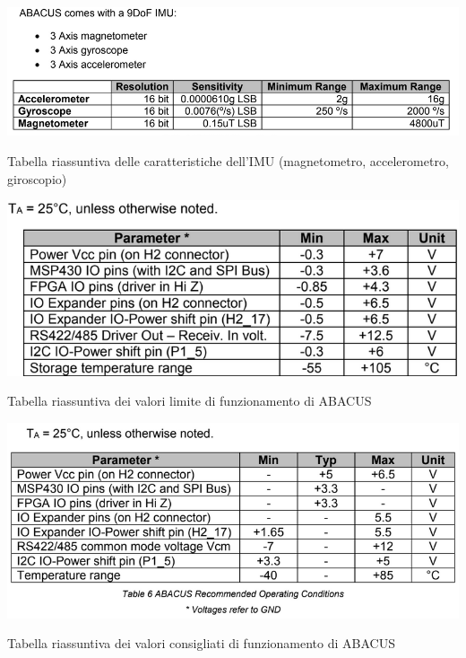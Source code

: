 \documentclass[LaM,binding=0.6cm,oneside]{../sapthesis}
\begin{document}
    \begin{table}[htbp]
    \centerline{\includegraphics[scale=.7]{examples/datasheet/abacusDatasheet3.PNG}}
    \caption{Tabella riassuntiva delle caratteristiche dell'IMU 
    (magnetometro, accelerometro,  giroscopio)}
    \label{fig}
    \end{table}

    \begin{table}[htbp]
    \centerline{\includegraphics[scale=.8]{examples/datasheet/abacusDatasheet4.PNG}}
    \caption{Tabella riassuntiva dei valori limite di funzionamento di ABACUS}
    \label{fig}
    \end{table}
    
    \begin{table}[htbp]
    \centerline{\includegraphics[scale=.8]{examples/datasheet/abacusDatasheet5.PNG}}
    \caption{Tabella riassuntiva dei valori consigliati di funzionamento di ABACUS}
    \label{fig}
    \end{table}
    
\end{document}
